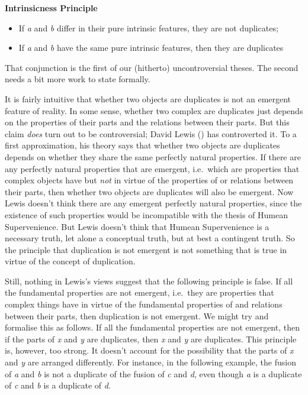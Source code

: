 \documentclass[
  11pt,
  letterpaper,
  DIV=11,
  numbers=noendperiod,
  twoside]{scrartcl}
\providecommand{\tightlist}{%
  \setlength{\itemsep}{0pt}\setlength{\parskip}{0pt}}\usepackage{longtable,booktabs,array}
\begin{document}
\textbf{Intrinsicness Principle}

\begin{itemize}
\tightlist
\item
  If \emph{a} and \emph{b} differ in their pure intrinsic features, they
  are not duplicates;
\item
  If \emph{a} and \emph{b} have the same pure intrinsic features, then
  they are duplicates
\end{itemize}

That conjunction is the first of our (hitherto) uncontroversial theses.
The second needs a bit more work to state formally.

It is fairly intuitive that whether two objects are duplicates is not an
emergent feature of reality. In some sense, whether two complex are
duplicates just depends on the properties of their parts and the
relations between their parts. But this claim \emph{does} turn out to be
controversial; David Lewis () has
controverted it. To a first approximation, his theory says that whether
two objects are duplicates depends on whether they share the same
perfectly natural properties. If there are any perfectly natural
properties that are emergent, i.e.~which are properties that complex
objects have but \emph{not} in virtue of the properties of or relations
between their parts, then whether two objects are duplicates will also
be emergent. Now Lewis doesn't think there are any emergent perfectly
natural properties, since the existence of such properties would be
incompatible with the thesis of Humean Supervenience. But Lewis doesn't
think that Humean Supervenience is a necessary truth, let alone a
conceptual truth, but at best a contingent truth. So the principle that
duplication is not emergent is not something that is true in virtue of
the concept of duplication.

Still, nothing in Lewis's views suggest that the following principle is
false. If all the fundamental properties are not emergent, i.e.~they are
properties that complex things have in virtue of the fundamental
properties of and relations between their parts, then duplication is not
emergent. We might try and formalise this as follows. If all the
fundamental properties are not emergent, then if the parts of \emph{x}
and \emph{y} are duplicates, then \emph{x} and \emph{y} are duplicates.
This principle is, however, too strong. It doesn't account for the
possibility that the parts of \emph{x} and \emph{y} are arranged
differently. For instance, in the following example, the fusion of
\emph{a} and \emph{b} is not a duplicate of the fusion of \emph{c} and
\emph{d}, even though \emph{a} is a duplicate of \emph{c} and \emph{b}
is a duplicate of \emph{d}.
\end{document}
